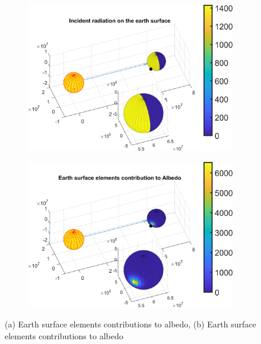 \documentclass[11pt]{article}
\begin{document}
 
\begin{figure}[h]
    \centering
    \begin{subfigure}[b]{0.48\textwidth}
        \includegraphics[width=\textwidth]{Matlab/images/WhitePaint_silicone/inc_sun_rad.png}
        \caption{}
        \label{fig:solar-rad-on-earth}
    \end{subfigure}
    \begin{subfigure}[b]{0.48\textwidth}
        \includegraphics[width=\textwidth]{Matlab/images/WhitePaint_silicone/albedo_elements.png}
        \caption{}
        \label{fig:albedo}
    \end{subfigure}
    \caption{(a) Earth surface elements contributions to albedo, (b) Earth surface elements contributions to albedo}
\end{figure}
\end{document}
